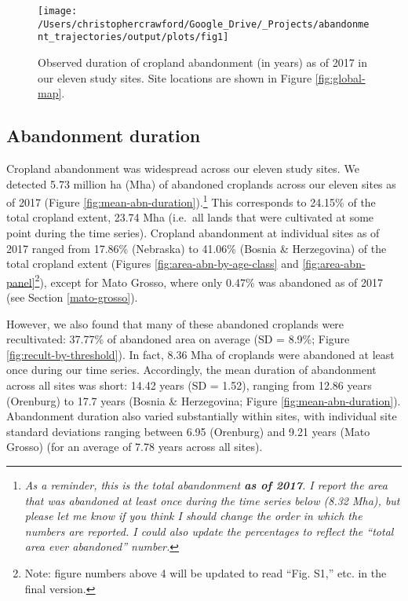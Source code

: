 \documentclass[9pt,twocolumn,twoside,]{pnas-new}
\begin{document}
\begin{figure*}
\texttt{[image: /Users/christophercrawford/Google\_Drive/\_Projects/abandonment\_trajectories/output/plots/fig1]} \caption{Observed duration of cropland
abandonment (in years) as of 2017 in our eleven study sites. Site
locations are shown in Figure \ref{fig:global-map}.}\label{fig:maps-abn-duration}
\end{figure*}

\hypertarget{abandonment-duration}{%
\subsection{Abandonment duration}\label{abandonment-duration}}

Cropland abandonment was widespread across our eleven study sites. We
detected 5.73 million ha (Mha) of abandoned croplands across our eleven
sites as of 2017 (Figure \ref{fig:mean-abn-duration}).\footnote{\emph{As
  a reminder, this is the total abandonment \textbf{as of 2017}. I
  report the area that was abandoned at least once during the time
  series below (8.32 Mha), but please let me know if you think I should
  change the order in which the numbers are reported. I could also
  update the percentages to reflect the ``total area ever abandoned''
  number.}} This corresponds to 24.15\% of the total cropland extent,
23.74 Mha (i.e.~all lands that were cultivated at some point during the
time series). Cropland abandonment at individual sites as of 2017 ranged
from 17.86\% (Nebraska) to 41.06\% (Bosnia \& Herzegovina) of the total
cropland extent (Figures \ref{fig:area-abn-by-age-class} and
\ref{fig:area-abn-panel}\footnote{Note: figure numbers above 4 will be
  updated to read ``Fig. S1,'' etc. in the final version.}), except for
Mato Grosso, where only 0.47\% was abandoned as of 2017 (see Section
\ref{mato-grosso}).

However, we also found that many of these abandoned croplands were
recultivated: 37.77\% of abandoned area on average (SD = 8.9\%; Figure
\ref{fig:recult-by-threshold}). In fact, 8.36 Mha of croplands were
abandoned at least once during our time series. Accordingly, the mean
duration of abandonment across all sites was short: 14.42 years (SD =
1.52), ranging from 12.86 years (Orenburg) to 17.7 years (Bosnia \&
Herzegovina; Figure \ref{fig:mean-abn-duration}). Abandonment duration
also varied substantially within sites, with individual site standard
deviations ranging between 6.95 (Orenburg) and 9.21 years (Mato Grosso)
(for an average of 7.78 years across all sites).
\end{document}

